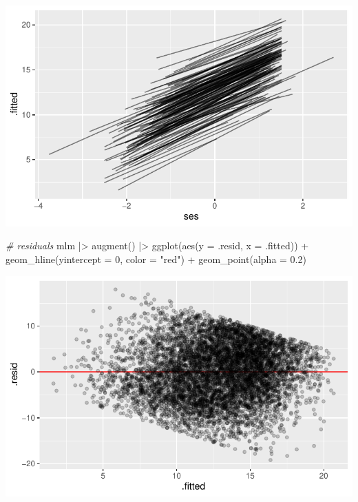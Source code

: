 \documentclass[
  letterpaper,
  DIV=11,
  numbers=noendperiod]{scrreprt}
\newenvironment{Shaded}{}{}
\newcommand{\AttributeTok}[1]{\textcolor[rgb]{0.49,0.56,0.16}{#1}}
\newcommand{\CommentTok}[1]{\textcolor[rgb]{0.38,0.63,0.69}{\textit{#1}}}
\newcommand{\DecValTok}[1]{\textcolor[rgb]{0.25,0.63,0.44}{#1}}
\newcommand{\FloatTok}[1]{\textcolor[rgb]{0.25,0.63,0.44}{#1}}
\newcommand{\FunctionTok}[1]{\textcolor[rgb]{0.02,0.16,0.49}{#1}}
\newcommand{\NormalTok}[1]{#1}
\newcommand{\SpecialCharTok}[1]{\textcolor[rgb]{0.25,0.44,0.63}{#1}}
\newcommand{\StringTok}[1]{\textcolor[rgb]{0.25,0.44,0.63}{#1}}
\begin{document}
\includegraphics{broom_files/figure-pdf/unnamed-chunk-12-1.pdf}

\begin{Shaded}
\begin{Highlighting}[]
\CommentTok{\# residuals}
\NormalTok{mlm }\SpecialCharTok{|\textgreater{}} 
  \FunctionTok{augment}\NormalTok{() }\SpecialCharTok{|\textgreater{}} 
  \FunctionTok{ggplot}\NormalTok{(}\FunctionTok{aes}\NormalTok{(}\AttributeTok{y =}\NormalTok{ .resid, }\AttributeTok{x =}\NormalTok{ .fitted)) }\SpecialCharTok{+}
  \FunctionTok{geom\_hline}\NormalTok{(}\AttributeTok{yintercept =} \DecValTok{0}\NormalTok{, }\AttributeTok{color =} \StringTok{"red"}\NormalTok{) }\SpecialCharTok{+}
  \FunctionTok{geom\_point}\NormalTok{(}\AttributeTok{alpha =} \FloatTok{0.2}\NormalTok{)}
\end{Highlighting}
\end{Shaded}

\includegraphics{broom_files/figure-pdf/unnamed-chunk-12-2.pdf}
\end{document}
